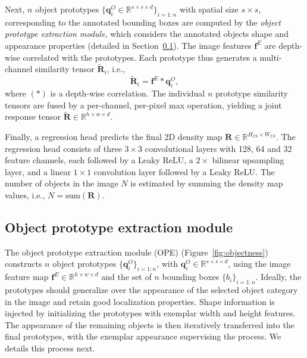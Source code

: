 \documentclass[10pt,twocolumn,letterpaper]{article}
\begin{document}
Next, $n$ object prototypes $\{ \mathbf{q}_{i}^{O} \in \mathbb{R}^{s\times s \times d} \}_{i=1:n}$ with spatial size $s \times s$, corresponding to the annotated bounding boxes are computed by the \textit{object prototype extraction module}, which considers the annotated objects shape and appearance properties (detailed in Section~\ref{sec:object_queries}). The image features $\mathbf{f}^{E}$ are depth-wise correlated with the prototypes. Each prototype thus generates a multi-channel similarity tensor $\tilde{\boldsymbol{R}}_i$, i.e.,
\begin{equation}  \label{eq:correlation}
    \tilde{\boldsymbol{R}}_i = \mathbf{f}^{E} * \mathbf{q}_{i}^{O},
\end{equation}
where $(*)$ is a depth-wise correlation. The individual $n$ prototype similarity tensors are fused by a per-channel, per-pixel max operation, yielding a joint response tensor
$\tilde{\boldsymbol{R}} \in \mathbb{R}^{h\times w\times d}$. 

Finally, a regression head predicts the final 2D density map $\boldsymbol{R} \in \mathbb{R}^{H_{IN}\times W_{IN}}$. The regression head consists of three $3\times 3$ convolutional layers with 128, 64 and 32 feature channels, each followed by a Leaky ReLU, a $2\times$ bilinear upsampling layer, and a linear $1 \times 1$ convolution layer followed by a Leaky ReLU. The number of objects in the image $N$ is estimated by summing the density map values, i.e., $N = \mathrm{sum}(\boldsymbol{R})$.

\subsection{Object prototype extraction module}\label{sec:object_queries}

The object prototype extraction module (OPE) (Figure~\ref{fig:objectness}) constructs $n$ object prototypes 
$\{ \mathbf{q}_{i}^{O} \}_{i=1:n}$, with $\mathbf{q}_{i}^{O} \in \mathbb{R}^{s\times s \times d}$, using the image feature map $\mathbf{f}^{E} \in \mathbb{R}^{h\times w\times d}$ and the set of $n$ bounding boxes $\{ b_i \}_{i=1:n}$. 
Ideally, the prototypes should generalize over the appearance of the selected object category in the image and retain good localization properties. 
Shape information is injected by initializing the prototypes with exemplar width and height features. The appearance of the remaining objects is then iteratively transferred into the final prototypes, with the exemplar appearance supervising the process. We details this process next.
\end{document}

